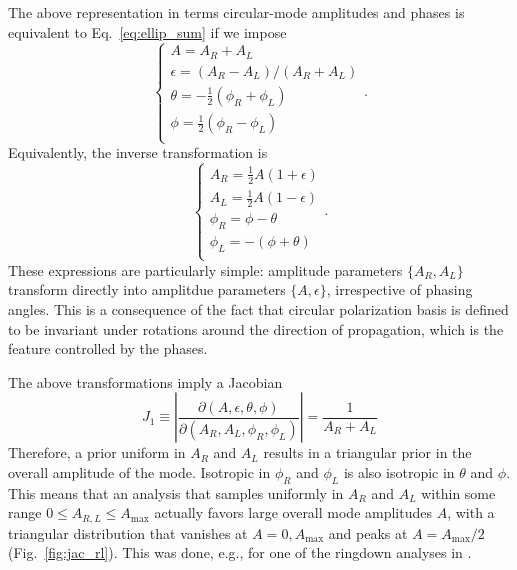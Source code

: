 \documentclass[aps,prd,twocolumn,superscriptaddress,preprintnumbers,floatfix,nofootinbib]{revtex4-2}
\begin{document}
The above representation in terms circular-mode amplitudes and phases is equivalent to Eq.~\eqref{eq:ellip_sum} if we impose
\begin{equation} \label{eq:Cphi_to_Aellip}
\begin{cases}
A = A_R + A_L \\
\epsilon = (A_R - A_L)/(A_R + A_L) \\ 
\theta = -\frac{1}{2}(\phi_R + \phi_L)\\
\phi = \frac{1}{2}(\phi_R - \phi_L)\\
\end{cases} .
\end{equation}
Equivalently, the inverse transformation is 
\begin{equation}
\begin{cases}
A_R = \frac{1}{2} A \left(1 + \epsilon\right) \\
A_L = \frac{1}{2} A \left(1 - \epsilon\right) \\
\phi_R = \phi - \theta \\ 
\phi_L = - (\phi + \theta) \\ 
\end{cases} .
\end{equation}
These expressions are particularly simple: amplitude parameters $\{ A_R, A_L\}$ transform directly into amplitdue parameters $\{A, \epsilon\}$, irrespective of phasing angles.
This is a consequence of the fact that circular polarization basis is defined to be invariant under rotations around the direction of propagation, which is the feature controlled by the phases.

The above transformations imply a Jacobian
\begin{equation}
J_1 \equiv \left| \frac{\partial(A,\epsilon,\theta,\phi)}{\partial(A_R, A_L, \phi_R, \phi_L)}\right| =  \frac{1}{A_R + A_L}
\end{equation}
Therefore, a prior uniform in $A_R$ and $A_L$ results in a triangular prior in the overall amplitude of the mode.
Isotropic in $\phi_R$ and $\phi_L$ is also isotropic in $\theta$ and $\phi$.
This means that an analysis that samples uniformly in $A_R$ and $A_L$ within some range $0 \leq A_{R,L} \leq A_\mathrm{max}$ actually favors large overall mode amplitudes $A$, with a triangular distribution that vanishes at $A=0,A_\mathrm{max}$ and peaks at $A = A_\mathrm{max}/2$ (Fig.~\ref{fig:jac_rl}).
This was done, e.g., for one of the ringdown analyses in \cite{LIGOScientific:2020tif}.
\end{document}
